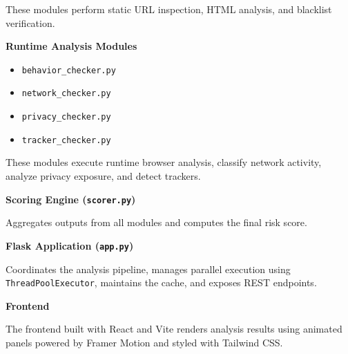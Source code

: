 These modules perform static URL inspection, HTML analysis, and blacklist verification.

\textbf{Runtime Analysis Modules}

\begin{itemize}
\item \texttt{behavior\_checker.py}
\item \texttt{network\_checker.py}
\item \texttt{privacy\_checker.py}
\item \texttt{tracker\_checker.py}
\end{itemize}

These modules execute runtime browser analysis, classify network activity, analyze privacy exposure, and detect trackers.

\textbf{Scoring Engine (\texttt{scorer.py})}

Aggregates outputs from all modules and computes the final risk score.

\textbf{Flask Application (\texttt{app.py})}

Coordinates the analysis pipeline, manages parallel execution using \texttt{ThreadPoolExecutor}, maintains the cache, and exposes REST endpoints.

\textbf{Frontend}

The frontend built with React and Vite renders analysis results using animated panels powered by Framer Motion and styled with Tailwind CSS.
